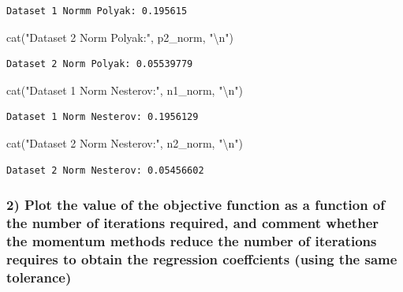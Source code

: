 \documentclass[
  letterpaper,
  DIV=11,
  numbers=noendperiod]{scrartcl}
\newenvironment{Shaded}{\begin{snugshade}}{\end{snugshade}}
\newcommand{\FunctionTok}[1]{\textcolor[rgb]{0.28,0.35,0.67}{#1}}
\newcommand{\NormalTok}[1]{\textcolor[rgb]{0.00,0.23,0.31}{#1}}
\newcommand{\SpecialCharTok}[1]{\textcolor[rgb]{0.37,0.37,0.37}{#1}}
\newcommand{\StringTok}[1]{\textcolor[rgb]{0.13,0.47,0.30}{#1}}
\begin{document}
\begin{verbatim}
Dataset 1 Normm Polyak: 0.195615 
\end{verbatim}

\begin{Shaded}
\begin{Highlighting}[]
\FunctionTok{cat}\NormalTok{(}\StringTok{"Dataset 2 Norm Polyak:"}\NormalTok{, p2\_norm, }\StringTok{"}\SpecialCharTok{\textbackslash{}n}\StringTok{"}\NormalTok{)}
\end{Highlighting}
\end{Shaded}

\begin{verbatim}
Dataset 2 Norm Polyak: 0.05539779 
\end{verbatim}

\begin{Shaded}
\begin{Highlighting}[]
\FunctionTok{cat}\NormalTok{(}\StringTok{"Dataset 1 Norm Nesterov:"}\NormalTok{, n1\_norm, }\StringTok{"}\SpecialCharTok{\textbackslash{}n}\StringTok{"}\NormalTok{)}
\end{Highlighting}
\end{Shaded}

\begin{verbatim}
Dataset 1 Norm Nesterov: 0.1956129 
\end{verbatim}

\begin{Shaded}
\begin{Highlighting}[]
\FunctionTok{cat}\NormalTok{(}\StringTok{"Dataset 2 Norm Nesterov:"}\NormalTok{, n2\_norm, }\StringTok{"}\SpecialCharTok{\textbackslash{}n}\StringTok{"}\NormalTok{)}
\end{Highlighting}
\end{Shaded}

\begin{verbatim}
Dataset 2 Norm Nesterov: 0.05456602 
\end{verbatim}

\subsubsection{2) Plot the value of the objective function as a function
of the number of iterations required, and comment whether the momentum
methods reduce the number of iterations requires to obtain the
regression coeffcients (using the same
tolerance)}\label{plot-the-value-of-the-objective-function-as-a-function-of-the-number-of-iterations-required-and-comment-whether-the-momentum-methods-reduce-the-number-of-iterations-requires-to-obtain-the-regression-coeffcients-using-the-same-tolerance}
\end{document}
